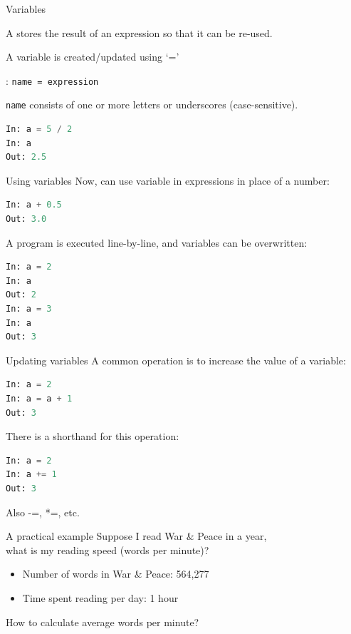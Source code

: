 \documentclass[aspectratio=169,usenames,dvipsnames]{beamer}
\begin{document}
\begin{frame}[fragile]{Variables}
    \begin{definition}
        A  stores the result of an expression
        so that it can be re-used.
    \end{definition}

A variable is created/updated using `='

\begin{definition}
: \texttt{name = expression}

\texttt{name} consists of one or more letters or underscores (case-sensitive).
\end{definition}

\begin{lstlisting}[language=python]
In: a = 5 / 2
In: a
Out: 2.5
\end{lstlisting}
\end{frame}

\begin{frame}[fragile]{Using variables}
Now, can use variable in expressions in place of a number:

\begin{lstlisting}[language=python]
In: a + 0.5
Out: 3.0
\end{lstlisting}

\pause
A program is executed line-by-line, and variables can be overwritten:
\begin{lstlisting}[language=python]
In: a = 2
In: a
Out: 2
In: a = 3
In: a
Out: 3
\end{lstlisting}
\end{frame}


\begin{frame}[fragile]{Updating variables}
A common operation is to increase the value of a variable:
\begin{lstlisting}[language=python]
In: a = 2
In: a = a + 1
Out: 3
\end{lstlisting}

\pause
There is a shorthand for this operation:
\begin{lstlisting}[language=python]
In: a = 2
In: a += 1
Out: 3
\end{lstlisting}

Also -=, *=, etc.
\end{frame}


\begin{frame}{A practical example}
    Suppose I read War \& Peace in a year, \\
    what is my reading speed (words per minute)?
    \begin{itemize}
        \item Number of words in War \& Peace: 564,277
        \item Time spent reading per day: 1 hour
    \end{itemize}
    How to calculate average words per minute?
\end{frame}
\end{document}
